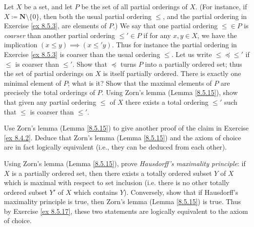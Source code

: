 \begin{exercise}\label{ex 8.5.16}
    Let \(X\) be a set, and let \(P\) be the set of all partial orderings of \(X\).
    (For instance, if \(X \coloneqq \mathbf{N} \setminus \{0\}\), then both the usual partial ordering \(\leq\), and the partial ordering in Exercise \ref{ex 8.5.3}, are elements of \(P\).)
    We say that one partial ordering \(\leq \in P\) is \emph{coarser} than another partial ordering \(\leq' \in P\) if for any \(x, y \in X\), we have the implication \((x \leq y) \implies (x \leq' y)\).
    Thus for instance the partial ordering in Exercise \ref{ex 8.5.3} is coarser than the usual ordering \(\leq\).
    Let us write \(\leq \preceq \leq'\) if \(\leq\) is coarser than \(\leq'\).
    Show that \(\preceq\) turns \(P\) into a partially ordered set;
    thus the set of partial orderings on \(X\) is itself partially ordered.
    There is exactly one minimal element of \(P\);
    what is it?
    Show that the maximal elements of \(P\) are precisely the total orderings of \(P\).
    Using Zorn's lemma (Lemma \ref{8.5.15}), show that given any partial ordering \(\leq\) of \(X\) there exists a total ordering \(\leq'\) such that \(\leq\) is coarser than \(\leq'\).
\end{exercise}

\begin{exercise}\label{ex 8.5.17}
    Use Zorn's lemma (Lemma \ref{8.5.15}) to give another proof of the claim in Exercise \ref{ex 8.4.2}.
    Deduce that Zorn's lemma (Lemma \ref{8.5.15}) and the axiom of choice are in fact logically equivalent
    (i.e., they can be deduced from each other).
\end{exercise}

\begin{exercise}\label{ex 8.5.18}
    Using Zorn's lemma (Lemma \ref{8.5.15}), prove \emph{Hausdorff's maximality principle}:
    if \(X\) is a partially ordered set, then there exists a totally ordered subset \(Y\) of \(X\) which is maximal with respect to set inclusion
    (i.e. there is no other totally ordered subset \(Y'\) of \(X\) which contains \(Y\)).
    Conversely, show that if Hausdorff's maximality principle is true, then Zorn's lemma (Lemma \ref{8.5.15}) is true.
    Thus by Exercise \ref{ex 8.5.17}, these two statements are logically equivalent to the axiom of choice.
\end{exercise}

